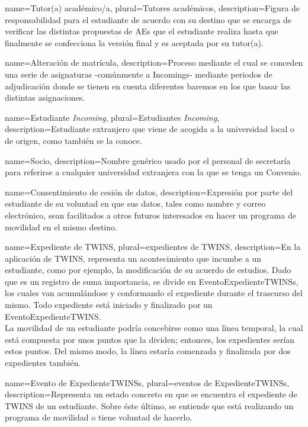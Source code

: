 {
	name=Tutor(a) académico/a,
	plural=Tutores académicos,
	description={Figura de responsabilidad para el estudiante de acuerdo con su destino que se encarga de verificar las distintas propuestas de \glspl{AE} que el estudiante realiza hasta que finalmente se confecciona la versión final y es aceptada por su tutor(a).}
}

{
	name=Alteración de matrícula,
	description={Proceso mediante el cual se conceden una serie de asignaturas -comúnmente a \glspl{Incoming}- mediante periodos de adjudicación donde se tienen en cuenta diferentes baremos en los que basar las distintas asignaciones.}
}

{
	name=Estudiante \textit{Incoming},
	plural=Estudiantes \textit{Incoming},
	description={Estudiante extranjero que viene de acogida a la universidad local o de origen, como también se la conoce.}
}

{
	name=Socio,
	description={Nombre genérico usado por el personal de secretaría para referirse a cualquier universidad extranjera con la que se tenga un \gls{Convenio}.}
}

{
	name=Consentimiento de cesión de datos,
	description={Expresión por parte del estudiante de su voluntad en que sus datos, tales como nombre y correo electrónico, sean facilitados a otros futuros interesados en hacer un programa de movilidad en el mismo destino.}
}

{
	name=Expediente de TWINS,
	plural=expedientes de TWINS,
	description={En la aplicación de TWINS, representa un acontecimiento que incumbe a un estudiante, como por ejemplo, la modificación de su acuerdo de estudios. Dado que es un registro de suma importancia, se divide en \glspl{EventoExpedienteTWINS}, los cuales van acumulándose y conformando el expediente durante el trascurso del mismo. Todo expediente está iniciado y finalizado por un \gls{EventoExpedienteTWINS}.\\La movilidad de un estudiante podría concebirse como una línea temporal, la cual está compuesta por unos puntos que la dividen; entonces, los expedientes serían estos puntos. Del mismo modo, la línea estaría comenzada y finalizada por dos expedientes también.}
}

{
	name=Evento de \glspl{ExpedienteTWINS},
	plural=eventos de \glspl{ExpedienteTWINS},
	description={Representa un estado concreto en que se encuentra el expediente de TWINS de un estudiante. Sobre éste último, se entiende que está realizando un programa de movilidad o tiene voluntad de hacerlo.}
}

